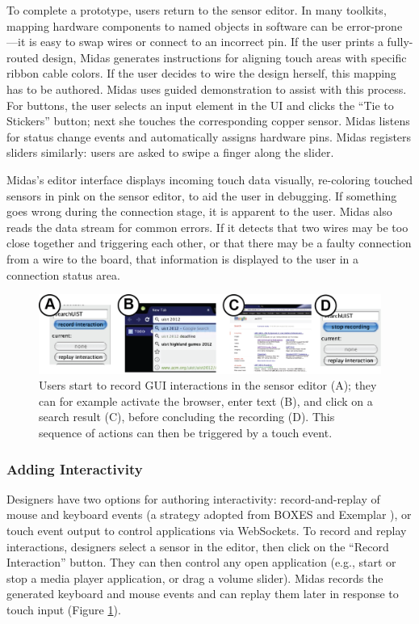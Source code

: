 To complete a prototype, users return to the sensor editor. In
many toolkits, mapping hardware components to named objects
in software can be error-prone---it is easy to swap wires
or connect to an incorrect pin. If the user prints a fully-routed
design, Midas generates instructions for aligning touch areas
with specific ribbon cable colors. If the user decides to wire 
the design herself, this mapping has to be authored. Midas
uses guided demonstration to assist with this process. For
buttons, the user selects an input element in the UI and clicks
the ``Tie to Stickers'' button; next she touches the corresponding
copper sensor. Midas listens for status change events and
automatically assigns hardware pins. Midas registers sliders
similarly: users are asked to swipe a finger along the slider.

Midas's editor interface displays incoming touch data visually,
re-coloring touched sensors in pink on the sensor editor,
to aid the user in debugging. If something goes wrong during
the connection stage, it is apparent to the user. Midas
also reads the data stream for common errors. If it detects
that two wires may be too close together and triggering each
other, or that there may be a faulty connection from a wire
to the board, that information is displayed to the user in a
connection status area.

\begin{figure}[t!]
\includegraphics[width=\textwidth]{figures/midas/demonstrate.png}
\caption{Users start to record GUI interactions in the sensor editor (A); they can for example activate the browser, enter text (B), and click on a search result (C), before concluding the recording (D). This sequence of actions can then be triggered by a touch event.} 
\label{fig:midas-demonstrate}
\end{figure}

        \subsubsection{Adding Interactivity}
Designers have two options for authoring interactivity: record-and-replay
of mouse and keyboard events (a strategy adopted
from BOXES \cite{hudson-boxes} and Exemplar \cite{hartmann-exemplar}), or touch event output
to control applications via WebSockets. To record and replay
interactions, designers select a sensor in the editor, then click
on the ``Record Interaction'' button. They can then control any
open application (e.g., start or stop a media player application,
or drag a volume slider). Midas records the generated
keyboard and mouse events and can replay them later in response
to touch input (Figure \ref{fig:midas-demonstrate}).


